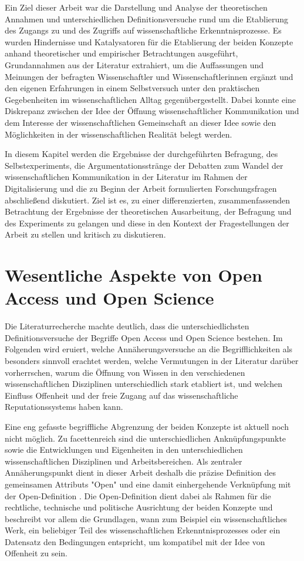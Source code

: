 Ein Ziel dieser Arbeit war die Darstellung und Analyse der theoretischen Annahmen und unterschiedlichen Definitionsversuche rund um die Etablierung des Zugangs zu und des Zugriffs auf wissenschaftliche Erkenntnisprozesse. Es wurden Hindernisse und Katalysatoren für die Etablierung der beiden Konzepte anhand theoretischer und empirischer Betrachtungen ausgeführt, Grundannahmen aus der Literatur extrahiert, um die Auffassungen und Meinungen der befragten Wissenschaftler und Wissenschaftlerinnen ergänzt und den eigenen Erfahrungen in einem Selbstversuch unter den praktischen Gegebenheiten im wissenschaftlichen Alltag gegenübergestellt. Dabei konnte eine Diskrepanz zwischen der Idee der Öffnung wissenschaftlicher Kommunikation und dem Interesse der wissenschaftlichen Gemeinschaft an dieser Idee sowie den Möglichkeiten in der wissenschaftlichen Realität belegt werden.

In diesem Kapitel werden die Ergebnisse der durchgeführten Befragung, des Selbstexperiments, die Argumentationsstränge der Debatten zum Wandel der wissenschaftlichen Kommunikation in der Literatur im Rahmen der Digitalisierung und die zu Beginn der Arbeit formulierten Forschungsfragen abschließend diskutiert. Ziel ist es, zu einer differenzierten, zusammenfassenden Betrachtung der Ergebnisse der theoretischen Ausarbeitung, der Befragung und des Experiments zu gelangen und diese in den Kontext der Fragestellungen der Arbeit zu stellen und kritisch zu diskutieren.

\section{Wesentliche Aspekte von Open Access und Open Science}

Die Literaturrecherche machte deutlich, dass die unterschiedlichsten Definitionsversuche der Begriffe Open Access und Open Science bestehen. Im Folgenden wird eruiert, welche Annäherungsversuche an die Begrifflichkeiten als besonders sinnvoll erachtet werden, welche Vermutungen in der Literatur darüber vorherrschen, warum die Öffnung von Wissen in den verschiedenen wissenschaftlichen Disziplinen unterschiedlich stark etabliert ist, und welchen Einfluss Offenheit und der freie Zugang auf das wissenschaftliche Reputationssystems haben kann.

Eine eng gefasste begriffliche Abgrenzung der beiden Konzepte ist aktuell noch nicht möglich. Zu facettenreich sind die unterschiedlichen Anknüpfungspunkte sowie die Entwicklungen und Eigenheiten in den unterschiedlichen wissenschaftlichen Disziplinen und Arbeitsbereichen. Als zentraler Annäherungspunkt dient in dieser Arbeit deshalb die präzise Definition des gemeinsamen Attributs "Open" und eine damit einhergehende Verknüpfung mit der Open-Definition \cite{open_definition}. Die Open-Definition dient dabei als Rahmen für die rechtliche, technische und politische Ausrichtung der beiden Konzepte und beschreibt vor allem die Grundlagen, wann zum Beispiel ein wissenschaftliches Werk, ein beliebiger Teil des wissenschaftlichen Erkenntnisprozesses oder ein Datensatz den Bedingungen entspricht, um kompatibel mit der Idee von Offenheit zu sein.

